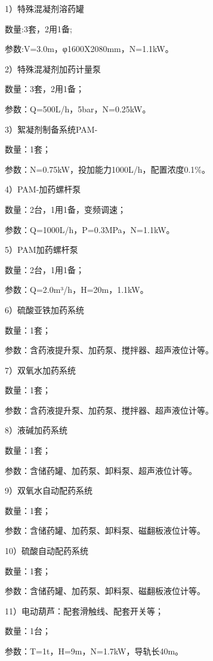 1）特殊混凝剂溶药罐	\par 
数量:3套，2用1备;\par 
参数:V=3.0m，φ1600X2080mm，N=1.1kW。\par 
2）特殊混凝剂加药计量泵	\par 
数量：3套，2用1备；\par 
参数：Q=500L/h，5bar，N=0.25kW。\par 
3）絮凝剂制备系统PAM-	\par 
数量：1套；\par 
参数：N=0.75kW，投加能力1000L/h，配置浓度0.1\%。\par 
4）PAM-加药螺杆泵	\par 
数量：2台，1用1备，变频调速；\par 
参数：Q=1000L/h，P=0.3MPa，N=1.1kW。\par 
5）PAM加药螺杆泵	\par 
数量：2台，1用1备；\par 
参数：Q=2.0m³/h，H=20m，1.1kW。\par 
6）硫酸亚铁加药系统	\par 
数量：1套；\par 
参数：含药液提升泵、加药泵、搅拌器、超声液位计等。\par 
7）双氧水加药系统	\par 
数量：1套；\par 
参数：含药液提升泵、加药泵、搅拌器、超声液位计等。\par 
8）液碱加药系统	\par 
数量：1套；\par 
参数：含储药罐、加药泵、卸料泵、超声液位计等。\par 
9）双氧水自动配药系统	\par 
数量：1套；\par 
参数：含储药罐、加药泵、卸料泵、磁翻板液位计等。\par 
10）硫酸自动配药系统	\par 
数量：1套；\par 
参数：含储药罐、加药泵、卸料泵、磁翻板液位计等。\par 
11）电动葫芦：配套滑触线、配套开关等；\par 
数量：1台；\par 
参数：T=1t，H=9m，N=1.7kW，导轨长40m。\par 
